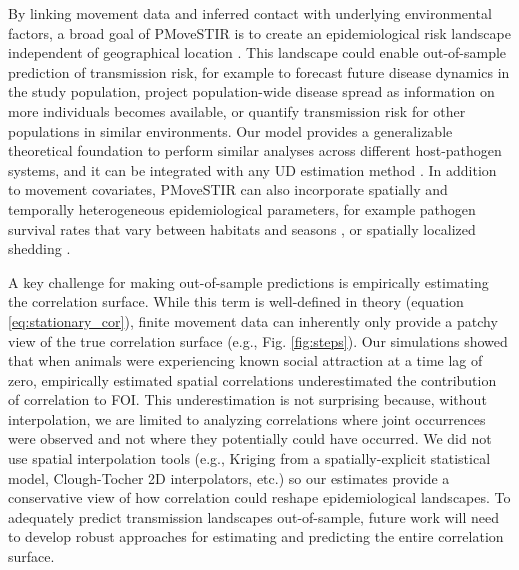 ﻿\documentclass[11pt]{article}
\begin{document}
By linking movement data and inferred contact with underlying environmental factors, a broad goal of PMoveSTIR is to create an epidemiological risk landscape independent of geographical location \citep{Merkle2018,Manlove2022}. This landscape could enable out-of-sample prediction of transmission risk, for example to forecast future disease dynamics in the study population, project population-wide disease spread as information on more individuals becomes available, or quantify transmission risk for other populations in similar environments. Our model provides a generalizable theoretical foundation to perform similar analyses across different host-pathogen systems, and it can be integrated with any UD estimation method \citep{Signer2017,Merkle2018,Michelot2020,Potts2023}. In addition to movement covariates, PMoveSTIR can also incorporate spatially and temporally heterogeneous epidemiological parameters, for example pathogen survival rates that vary between habitats and seasons \citep{Daversa2017}, or spatially localized shedding \citep{Weinstein2018a}.


A key challenge for making out-of-sample predictions is empirically estimating the correlation surface.  While this term is well-defined in theory (equation \ref{eq:stationary_cor}), finite movement data can inherently only provide a patchy view of the true correlation surface (e.g., Fig. \ref{fig:steps}).  Our simulations showed that when animals were experiencing known social attraction at a time lag of zero, empirically estimated spatial correlations underestimated the contribution of correlation to FOI. This underestimation is not surprising because, without interpolation, we are limited to analyzing correlations where joint occurrences were observed and not where they potentially could have occurred. We did not use spatial interpolation tools (e.g., Kriging from a spatially-explicit statistical model, Clough-Tocher 2D interpolators, etc.) so our estimates provide a conservative view of how correlation could reshape epidemiological landscapes.  To adequately predict transmission landscapes out-of-sample, future work will need to develop robust approaches for estimating and predicting the entire correlation surface. 
\end{document}
